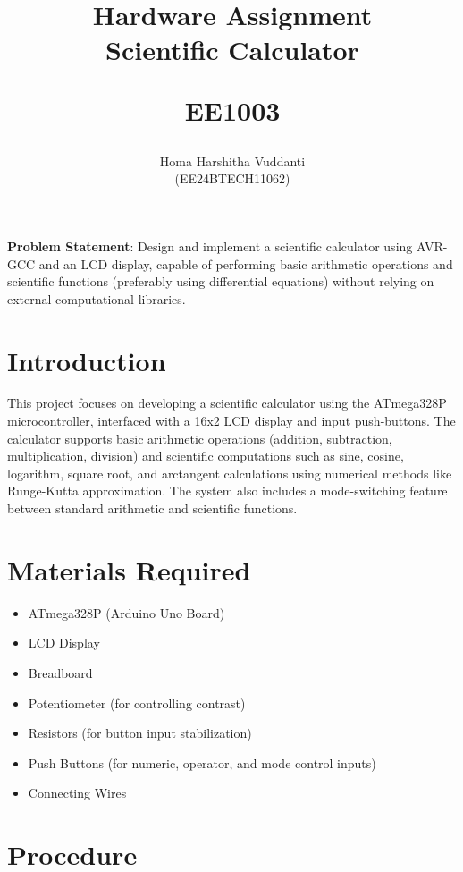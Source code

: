 \documentclass[journal]{IEEEtran}
\begin{document}
\title{
Hardware Assignment \\ Scientific Calculator

\large{EE1003}
}

\author{Homa Harshitha Vuddanti \\(EE24BTECH11062)}

\maketitle

\bigskip

\textbf{Problem Statement}: Design and implement a scientific calculator using AVR-GCC and an LCD display, capable of performing basic arithmetic operations and scientific functions (preferably using differential equations) without relying on external computational libraries.

\section{Introduction}
This project focuses on developing a scientific calculator using the ATmega328P microcontroller, interfaced with a 16x2 LCD display and input push-buttons. The calculator supports basic arithmetic operations (addition, subtraction, multiplication, division) and scientific computations such as sine, cosine, logarithm, square root, and arctangent calculations using numerical methods like Runge-Kutta approximation. The system also includes a mode-switching feature between standard arithmetic and scientific functions.

\section{Materials Required}
\begin{itemize}
    \item ATmega328P (Arduino Uno Board)
    \item LCD Display
    \item Breadboard
    \item Potentiometer (for controlling contrast)
    \item Resistors (for button input stabilization)
    \item Push Buttons (for numeric, operator, and mode control inputs)
    \item Connecting Wires
\end{itemize}

\section{Procedure}
\end{document}
